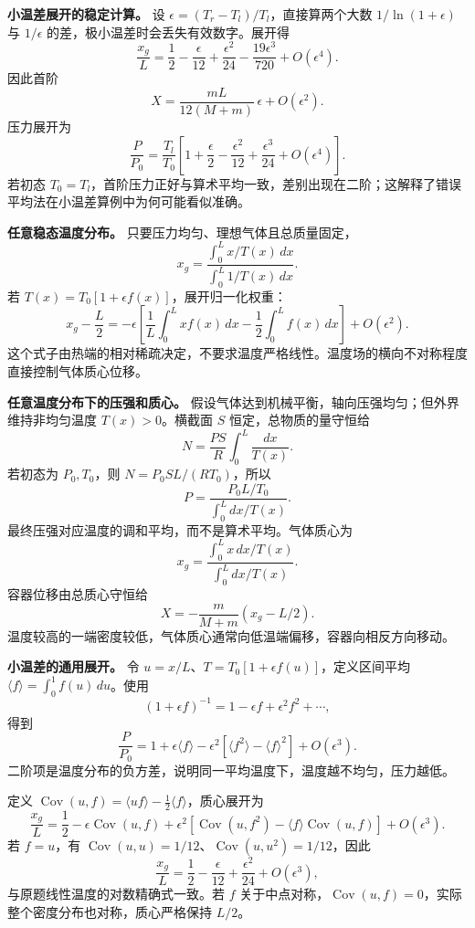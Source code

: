 \documentclass[12pt,a4paper,UTF8]{ctexart}
\begin{document}
\textbf{小温差展开的稳定计算。} 设
\(\epsilon=(T_r-T_l)/T_l\)，直接算两个大数 \(1/\ln(1+\epsilon)\) 与
\(1/\epsilon\) 的差，极小温差时会丢失有效数字。展开得 \[
\frac{x_g}{L}=\frac12-\frac{\epsilon}{12}
+\frac{\epsilon^2}{24}-\frac{19\epsilon^3}{720}+O(\epsilon^4).
\] 因此首阶 \[
X=\frac{mL}{12(M+m)}\,\epsilon+O(\epsilon^2).
\] 压力展开为 \[
\frac P{P_0}=\frac{T_l}{T_0}
\left[1+\frac\epsilon2-\frac{\epsilon^2}{12}
+\frac{\epsilon^3}{24}+O(\epsilon^4)\right].
\] 若初态
\(T_0=T_l\)，首阶压力正好与算术平均一致，差别出现在二阶；这解释了错误平均法在小温差算例中为何可能看似准确。

\textbf{任意稳态温度分布。} 只要压力均匀、理想气体且总质量固定， \[
x_g=\frac{\int_0^L x/T(x)\,dx}{\int_0^L1/T(x)\,dx}.
\] 若 \(T(x)=T_0[1+\epsilon f(x)]\)，展开归一化权重： \[
x_g-\frac L2=-\epsilon
\left[\frac1L\int_0^Lxf(x)\,dx
-\frac12\int_0^Lf(x)\,dx\right]+O(\epsilon^2).
\]
这个式子由热端的相对稀疏决定，不要求温度严格线性。温度场的横向不对称程度直接控制气体质心位移。

\textbf{任意温度分布下的压强和质心。}
假设气体达到机械平衡，轴向压强均匀；但外界维持非均匀温度
\(T(x)>0\)。横截面 \(S\) 恒定，总物质的量守恒给 \[
N=\frac{PS}{R}\int_0^L\frac{dx}{T(x)}.
\] 若初态为 \(P_0,T_0\)，则 \(N=P_0SL/(RT_0)\)，所以 \[
\boxed{P=\frac{P_0L/T_0}{\int_0^Ldx/T(x)}}.
\] 最终压强对应温度的调和平均，而不是算术平均。气体质心为 \[
\boxed{x_g=
\frac{\int_0^Lx\,dx/T(x)}
{\int_0^Ldx/T(x)}}.
\] 容器位移由总质心守恒给 \[
X=-\frac{m}{M+m}(x_g-L/2).
\]
温度较高的一端密度较低，气体质心通常向低温端偏移，容器向相反方向移动。

\textbf{小温差的通用展开。} 令
\(u=x/L\)、\(T=T_0[1+\epsilon f(u)]\)，定义区间平均
\(\langle f\rangle=\int_0^1f(u)\,du\)。使用 \[
(1+\epsilon f)^{-1}=1-\epsilon f+\epsilon^2f^2+\cdots,
\] 得到 \[
\boxed{\frac{P}{P_0}=1+\epsilon\langle f\rangle
-\epsilon^2[\langle f^2\rangle-\langle f\rangle^2]+O(\epsilon^3)}.
\]
二阶项是温度分布的负方差，说明同一平均温度下，温度越不均匀，压力越低。

定义
\(\operatorname{Cov}(u,f)=\langle uf\rangle-\tfrac12\langle f\rangle\)，质心展开为
\[
\frac{x_g}{L}=\frac12-\epsilon\operatorname{Cov}(u,f)
+\epsilon^2\left[
\operatorname{Cov}(u,f^2)-\langle f\rangle\operatorname{Cov}(u,f)
\right]+O(\epsilon^3).
\] 若 \(f=u\)，有
\(\operatorname{Cov}(u,u)=1/12\)、\(\operatorname{Cov}(u,u^2)=1/12\)，因此
\[
\frac{x_g}{L}=\frac12-\frac{\epsilon}{12}
+\frac{\epsilon^2}{24}+O(\epsilon^3),
\] 与原题线性温度的对数精确式一致。若 \(f\)
关于中点对称，\(\operatorname{Cov}(u,f)=0\)，实际整个密度分布也对称，质心严格保持
\(L/2\)。
\end{document}
